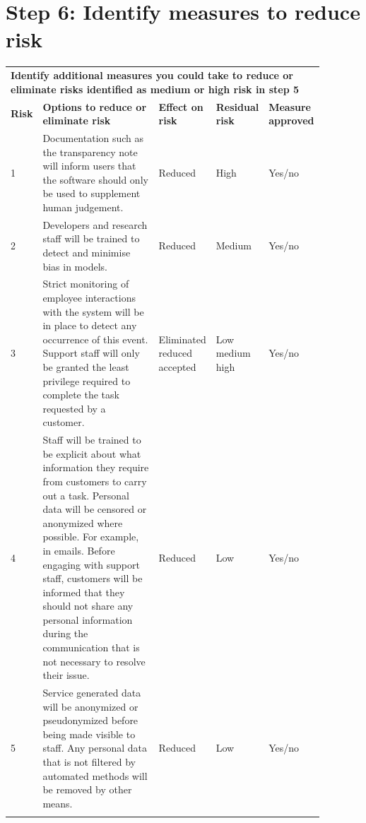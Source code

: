 \documentclass[12pt]{extarticle}
\begin{document}

\section*{Step 6: Identify measures to reduce risk}


\begin{table}[H]
\centering
\begin{tabular}{p{0.05\linewidth}p{0.45\linewidth}p{0.15\linewidth}p{0.1\linewidth}p{0.13\linewidth}}
\hline
\multicolumn{5}{p{\linewidth}}{\textbf{Identify additional measures you could take to reduce or eliminate risks identified as medium or high risk in step 5}} \\
\hhline{-----}
\textbf{Risk } & 
\textbf{Options to reduce or eliminate risk} & 
\textbf{Effect on risk} & 
\textbf{Residual risk} & 
\textbf{Measure approved} \\
\hhline{-----}
1 & 
Documentation such as the transparency note \cite{transparencynote} will inform users that the software should only be used to supplement human judgement.
& 
Reduced & 
High & 
Yes/no \\
\hhline{-----}
2 & 
Developers and research staff will be trained to detect and minimise bias in models. & 
Reduced & 
Medium & 
Yes/no \\
\hhline{-----}
3 & 
Strict monitoring of employee interactions with the system will be in place to detect any occurrence of this event.
Support staff will only be granted the least privilege required to complete the task requested by a customer.
& 
Eliminated reduced accepted & 
Low medium high & 
Yes/no \\
\hhline{-----}
4 & 
Staff will be trained to be explicit about what information they require from customers to carry out a task. 
Personal data will be censored or anonymized where possible. 
For example, in emails.
Before engaging with support staff, customers will be informed that they should not share any personal information during the communication that is not necessary to resolve their issue.
& 
Reduced & 
Low & 
Yes/no \\
\hhline{-----}
5 & 
Service generated data will be anonymized or pseudonymized before being made visible to staff. 
Any personal data that is not filtered by automated methods will be removed by other means.
& 
Reduced & 
Low & 
Yes/no \\
\hhline{-----}
\end{tabular}
\end{table}
\end{document}
